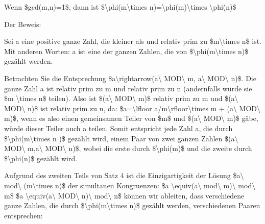 \documentclass[a4paper]{article}
\begin{document}
\begin{multicols}{3}
\begin{itemize*}
            \begin{itemize*}
                  \item Wenn \$gcd(m,n)=1\$, dann ist \$\textbackslash phi(m\textbackslash times n)=\textbackslash phi(m)\textbackslash times \textbackslash phi(n)\$
                  \item Der Beweis:
                  \begin{itemize*} \item Sei a eine positive ganze Zahl, die kleiner als und relativ prim zu \$m\textbackslash times n\$ ist. Mit anderen Worten: a ist eine der ganzen Zahlen, die von \$\textbackslash phi(m\textbackslash times n)\$ gezählt werden. \item Betrachten Sie die Entsprechung \$a\textbackslash rightarrow(a\textbackslash{} MOD\textbackslash{} m, a\textbackslash{} MOD\textbackslash{} n)\$. Die ganze Zahl a ist relativ prim zu m und relativ prim zu n (andernfalls würde sie \$m \textbackslash times n\$ teilen). Also ist \$(a\textbackslash{} MOD\textbackslash{} m)\$ relativ prim zu m und \$(a\textbackslash{} MOD\textbackslash{} n)\$ ist relativ prim zu n, da: \$a=\textbackslash lfloor a/m\textbackslash rfloor\textbackslash times m + (a\textbackslash{} MOD\textbackslash{} m)\$, wenn es also einen gemeinsamen Teiler von \$m\$ und \$(a\textbackslash{} MOD\textbackslash{} m)\$ gäbe, würde dieser Teiler auch a teilen. Somit entspricht jede Zahl a, die durch \$\textbackslash phi(m\textbackslash times n )\$ gezählt wird, einem Paar von zwei ganzen Zahlen \$(a\textbackslash{} MOD\textbackslash{} m,a\textbackslash{} MOD\textbackslash{} n)\$, wobei die erste durch \$\textbackslash phi(m)\$ und die zweite durch \$\textbackslash phi(n)\$ gezählt wird. \item Aufgrund des zweiten Teils von Satz 4 ist die Einzigartigkeit der Lösung \$a\textbackslash{} mod\textbackslash{} (m\textbackslash times n)\$ der simultanen Kongruenzen: \$a \textbackslash equiv(a\textbackslash{} mod\textbackslash{} m)\textbackslash{} mod\textbackslash{} m\$ \$a \textbackslash equiv(a\textbackslash{} MOD\textbackslash{} n)\textbackslash{} mod\textbackslash{} n\$ können wir ableiten, dass verschiedene ganze Zahlen, die durch \$\textbackslash phi(m\textbackslash times n)\$ gezählt werden, verschiedenen Paaren entsprechen:

\end{itemize*}
\end{itemize*}
\end{itemize*}
\end{multicols}
\end{document}
